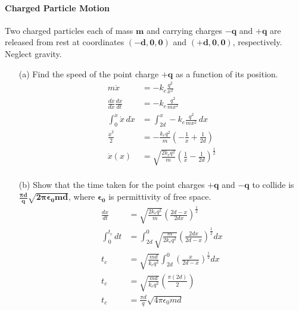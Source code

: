 \documentclass[]{article}
\begin{document}
{		\paragraph{Charged Particle Motion} Two charged particles each of mass $\bm{m}$ and carrying charges $\bm{-q}$ and $\bm{+q}$ are released from rest at coordinates $\bm{(-d,0,0)}$ and $\bm{(+d,0,0)}$, respectively. Neglect gravity.
		\begin{enumerate}
			\item[(a)] Find the speed of the point charge $\bm{+q}$ as a function of its position.
				\begin{equation*}
					\begin{split}
						m\ddot{x} &= -k_e\frac{q^2}{x^2} \\
						\frac{d\dot{x}}{dx} \frac{dx}{dt} &= -k_e\frac{q^2}{mx^2} \\
						\int_{0}^{\dot{x}} \dot{x} \, d\dot{x} &= \int_{2d}^{x} -k_e\frac{q^2}{mx^2} \, dx \\
						\frac{\dot{x}^2}{2} &= -\frac{k_e q^2}{m} \left( - \frac{1}{x} + \frac{1}{2d} \right) \\
						\dot{x}(x) &= \sqrt{\frac{2k_e q^2}{m}} \left( \frac{1}{x} - \frac{1}{2d} \right)^{\frac{1}{2}} \\
					\end{split}
				\end{equation*}
			\item[(b)] Show that the time taken for the point charges $\bm{+q}$ and $\bm{-q}$ to collide is $\bm{\frac{\pi d}{q} \sqrt{2\pi \epsilon_0 m d}}$, where $\bm{\epsilon_0}$ is permittivity of free space.
				\begin{equation*}
					\begin{split}
						\frac{dx}{dt} &= \sqrt{\frac{2k_e q^2}{m}} \left( \frac{2d - x}{2dx} \right)^{\frac{1}{2}} \\
						\int_{0}^{t_c} dt &= \int_{2d}^{0}  \sqrt{\frac{m}{2k_e q^2}} \left( \frac{2dx}{2d - x} \right)^{\frac{1}{2}} dx \\
						t_c &= \sqrt{\frac{md}{k_e q^2}} \int_{2d}^{0} \left( \frac{x}{2d - x} \right)^{\frac{1}{2}} dx \\
						t_c &= \sqrt{\frac{md}{k_e q^2}} \left( \frac{\pi (2d)}{2} \right) \\
						t_c &= \frac{\pi d}{q}\sqrt{4\pi \epsilon_0 md} \\
					\end{split}
				\end{equation*}
		\end{enumerate}
	
}
\end{document}
